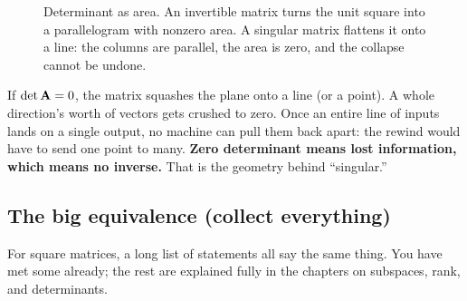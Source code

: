 \begin{figure}[H]
\centering
{}
\caption{Determinant as area. An invertible matrix turns the unit square into a
parallelogram with nonzero area. A singular matrix flattens it onto a line: the
columns are parallel, the area is zero, and the collapse cannot be undone.}
\label{ch08:areacollapse}
\end{figure}

\begin{intuitionbox}
If $\det\mathbf{A} = 0$, the matrix squashes the plane onto a line (or a point). A whole
direction's worth of vectors gets crushed to zero. Once an entire line of inputs lands on
a single output, no machine can pull them back apart: the rewind would have to send
one point to many. \textbf{Zero determinant means lost information, which means no inverse.}
That is the geometry behind ``singular.''
\end{intuitionbox}

\subsection{The big equivalence (collect everything)}

For square matrices, a long list of statements all say the same thing. You have met some
already; the rest are explained fully in the chapters on subspaces, rank, and determinants.

